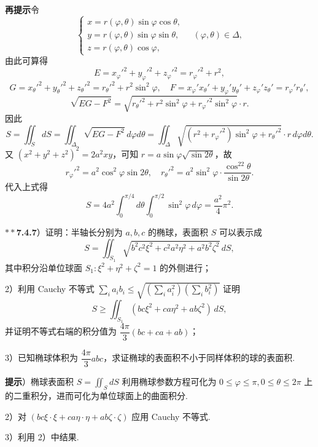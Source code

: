 \documentclass[UTF8, 12pt, fontset=fandol, oneside]{ctexart}
\begin{document}
\noindent\textbf{再提示}\quad 令
\[
\begin{cases}
x=r(\varphi,\theta)\sin\varphi\cos\theta,\\
y=r(\varphi,\theta)\sin\varphi\sin\theta,\\
z=r(\varphi,\theta)\cos\varphi,
\end{cases}
\quad(\varphi,\theta)\in\Delta,
\]
由此可算得
\[
E=x_\varphi'^2+y_\varphi'^2+z_\varphi'^2=r_\varphi'^2+r^2,
\]
\[
G=x_\theta'^2+y_\theta'^2+z_\theta'^2=r_\theta'^2+r^2\sin^2\varphi,\quad
F=x_\varphi'x_\theta'+y_\varphi'y_\theta'+z_\varphi'z_\theta'=r_\varphi'r_\theta',
\]
\[
\sqrt{EG-F^2}
=\sqrt{r_\theta'^2+r^2\sin^2\varphi+r_\varphi'^2\sin^2\varphi}\cdot r.
\]
因此
\[
S=\iint_SdS=\iint_\Delta\sqrt{EG-F^2}\,d\varphi d\theta
=\iint_\Delta\sqrt{(r^2+r_\varphi'^2)\sin^2\varphi+r_\theta'^2}\cdot r\,d\varphi d\theta.
\]
又 $(x^2+y^2+z^2)^2=2a^2xy$，可知 $r=a\sin\varphi\sqrt{\sin2\theta}$，故
\[
r_\varphi'^2=a^2\cos^2\varphi\sin2\theta,\quad
r_\theta'^2=a^2\sin^2\varphi\cdot\frac{\cos^22\theta}{\sin2\theta}.
\]
代入上式得
\[
S=4a^2\int_0^{\pi/4}d\theta\int_0^{\pi/2}\sin^2\varphi\,d\varphi
=\frac{a^2}{4}\pi^2.
\]

\noindent\textbf{$**$7.4.7}）证明：半轴长分别为 $a,b,c$ 的椭球，表面积 $S$ 可以表示成
\[
S=\iint_{S_1}\sqrt{b^2c^2\xi^2+c^2a^2\eta^2+a^2b^2\zeta^2}\,dS, \tag{1}
\]
其中积分沿单位球面 $S_1:\xi^2+\eta^2+\zeta^2=1$ 的外侧进行；

2）利用 Cauchy 不等式 $\sum_i a_ib_i\le\sqrt{\left(\sum_i a_i^2\right)\left(\sum_i b_i^2\right)}$ 证明
\[
S\ge\iint_{S_1}(bc\xi^2+ca\eta^2+ab\zeta^2)\,dS,
\]
并证明不等式右端的积分值为 $\dfrac{4\pi}{3}(bc+ca+ab)$；

3）已知椭球体积为 $\dfrac{4\pi}{3}abc$，求证椭球的表面积不小于同样体积的球的表面积.

\noindent\textbf{提示}）椭球表面积 $S=\iint_SdS$ 利用椭球参数方程可化为 $0\le\varphi\le\pi,0\le\theta\le2\pi$ 上的二重积分，进而可化为单位球面上的曲面积分.

2）对 $(bc\xi\cdot\xi+ca\eta\cdot\eta+ab\zeta\cdot\zeta)$ 应用 Cauchy 不等式.

3）利用 2）中结果.
\end{document}

